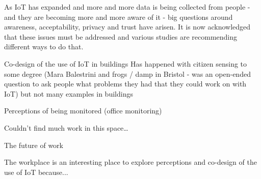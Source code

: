As IoT has expanded and more and more data is being collected from
people - and they are becoming more and more aware of it - big
questions around awareness, acceptability, privacy and trust have
arisen. It is now acknowledged that these issues must be addressed and
various studies are recommending different ways to do that. 
 
Co-design of the use of IoT in buildings
Has happened with citizen sensing to some degree (Mara Balestrini and
frogs / damp in Bristol - was an open-ended question to ask people
what problems they had that they could work on with IoT) but not many
examples in buildings

Perceptions of being monitored (office monitoring)

Couldn’t find much work in this space…

The future of work

The workplace is an interesting place to explore perceptions and co-design of the use of IoT because...


